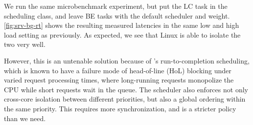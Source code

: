 We run the same microbenchmark experiment, but put the LC task in the
\fifoclass{} scheduling class, and leave BE tasks with the default
\normalclass{} scheduler and weight. \autoref{fig:srv-bg-rt} shows the resulting
measured latencies in the same low and high load setting as previously. As
expected, we see that Linux is able to isolate the two very well.

However, this is an untenable solution because of \fifoclass{}'s
run-to-completion scheduling, which is known to have a failure mode of
head-of-line (HoL) blocking under varied request processing times, where
long-running requests monopolize the CPU while short requests wait in the queue.
The \fifoclass{} scheduler also enforces not only cross-core isolation between
different priorities, but also a global ordering within the same priority. This
requires more synchronization, and is a stricter policy than we need.


